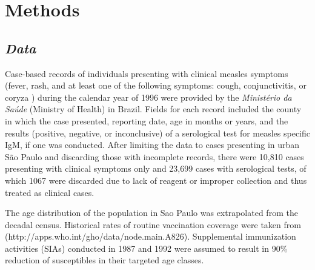 \section{\texorpdfstring{\textbf{Methods}}{Methods}}\label{methods}

\subsection{\texorpdfstring{\emph{Data}}{Data}}\label{data}

Case-based records of individuals presenting with clinical measles symptoms (fever, rash, and at least one of the following symptoms: cough, conjunctivitis, or coryza \cite{Hutchins_2004}) during the calendar year of 1996 were provided by the \textit{Ministério da Saúde} (Ministry of Health) in Brazil. Fields for each record included the county in which the case presented, reporting date, age in months or years, and the results (positive, negative, or inconclusive) of a serological test for measles specific IgM, if one was conducted. After limiting the data to cases presenting in urban S\~{a}o Paulo and discarding those with incomplete records, there were 10,810 cases presenting with clinical symptoms only
and 23,699 cases with serological tests, of which 1067 were discarded due to lack of reagent or improper collection and thus treated as clinical cases.

The age distribution of the population in Sao Paulo was extrapolated from the decadal census. Historical rates of routine vaccination coverage were taken from (http://apps.who.int/gho/data/node.main.A826). Supplemental immunization activities (SIAs) conducted in 1987 and 1992 were assumed to result in 90\% reduction of susceptibles in their targeted age classes.